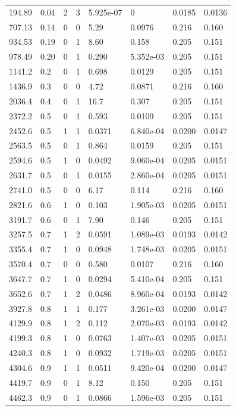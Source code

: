 \documentclass[preview]{standalone}
\begin{document}
{{\begin{tabular}{L{1.2cm}C{1.2cm} C{0.3cm}C{0.5cm} C{1.4cm}C{1.4cm} C{1.4cm}C{1.4cm}}
  194.89  &  0.04  & 2     &  3 &  5.925e-07  & 0  & 0.0185 &  0.0136   \\ 
  707.13  &  0.14  & 0     &  0 &  5.29  & 0.0976  & 0.216 &  0.160   \\ 
  934.53  &  0.19  & 0     &  1 &  8.60  & 0.158  & 0.205 &  0.151   \\ 
  978.49  &  0.20  & 0     &  1 &  0.290  & 5.352e-03  & 0.205 &  0.151   \\ 
  1141.2  &   0.2  & 0     &  1 &  0.698  & 0.0129  & 0.205 &  0.151   \\ 
  1436.9  &   0.3  & 0     &  0 &  4.72  & 0.0871  & 0.216 &  0.160   \\ 
  2036.4  &   0.4  & 0     &  1 &  16.7  & 0.307  & 0.205 &  0.151   \\ 
  2372.2  &   0.5  & 0     &  1 &  0.593  & 0.0109  & 0.205 &  0.151   \\ 
  2452.6  &   0.5  & 1     &  1 &  0.0371  & 6.840e-04  & 0.0200 &  0.0147   \\ 
  2563.5  &   0.5  & 0     &  1 &  0.864  & 0.0159  & 0.205 &  0.151   \\ 
  2594.6  &   0.5  & 1     &  0 &  0.0492  & 9.060e-04  & 0.0205 &  0.0151   \\ 
  2631.7  &   0.5  & 0     &  1 &  0.0155  & 2.860e-04  & 0.0205 &  0.0151   \\ 
  2741.0  &   0.5  & 0     &  0 &  6.17  & 0.114  & 0.216 &  0.160   \\ 
  2821.6  &   0.6  & 1     &  0 &  0.103  & 1.905e-03  & 0.0205 &  0.0151   \\ 
  3191.7  &   0.6  & 0     &  1 &  7.90  & 0.146  & 0.205 &  0.151   \\ 
  3257.5  &   0.7  & 1     &  2 &  0.0591  & 1.089e-03  & 0.0193 &  0.0142   \\ 
  3355.4  &   0.7  & 1     &  0 &  0.0948  & 1.748e-03  & 0.0205 &  0.0151   \\ 
  3570.4  &   0.7  & 0     &  0 &  0.580  & 0.0107  & 0.216 &  0.160   \\ 
  3647.7  &   0.7  & 1     &  0 &  0.0294  & 5.410e-04  & 0.205 &  0.151   \\ 
  3652.6  &   0.7  & 1     &  2 &  0.0486  & 8.960e-04  & 0.0193 &  0.0142   \\ 
  3927.8  &   0.8  & 1     &  1 &  0.177  & 3.261e-03  & 0.0200 &  0.0147   \\ 
  4129.9  &   0.8  & 1     &  2 &  0.112  & 2.070e-03  & 0.0193 &  0.0142   \\ 
  4199.3  &   0.8  & 1     &  0 &  0.0763  & 1.407e-03  & 0.0205 &  0.0151   \\ 
  4240.3  &   0.8  & 1     &  0 &  0.0932  & 1.719e-03  & 0.0205 &  0.0151   \\ 
  4304.6  &   0.9  & 1     &  1 &  0.0511  & 9.420e-04  & 0.0200 &  0.0147   \\ 
  4419.7  &   0.9  & 0     &  1 &  8.12  & 0.150  & 0.205 &  0.151   \\ 
  4462.3  &   0.9  & 0     &  1 &  0.0866  & 1.596e-03  & 0.205 &  0.151   \\ 
\hline 
\end{tabular} 

}}
\end{document}
